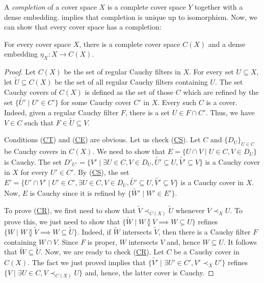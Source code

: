 \documentclass[reqno]{amsart}
\newcommand{\axref}[1]{(\hyperref[ax:#1]{#1})}
\theoremstyle{definition}
\theoremstyle{remark}
\numberwithin{figure}{section}
\newcommand{\overlap}[2]{#1 \between #2}
\newcommand{\rb}{\prec}
\begin{document}
A \emph{completion} of a cover space $X$ is a complete cover space $Y$ together with a dense embedding.
 implies that completion is unique up to isomorphism.
Now, we can show that every cover space has a completion:

\begin{thm}[completion]
For every cover space $X$, there is a complete cover space $C(X)$ and a dense embedding $\eta_X : X \to C(X)$.
\end{thm}
\begin{proof}
Let $C(X)$ be the set of regular Cauchy filters in $X$.
For every set $U \subseteq X$, let $\widetilde{U} \subseteq C(X)$ be the set of all regular Cauchy filters containing $U$.
The set Cauchy covers of $C(X)$ is defined as the set of those $C$ which are refined by the set $\{ \widetilde{U'} \mid U' \in C' \}$ for some Cauchy cover $C'$ in $X$.
Every such $C$ is a cover.
Indeed, given a regular Cauchy filter $F$, there is a set $U \in F \cap C'$.
Thus, we have $V \in C$ such that $F \in \widetilde{U} \subseteq V$.

Conditions \axref{CT} and \axref{CE} are obvious.
Let us check \axref{CS}.
Let $C$ and $\{ D_U \}_{U \in C}$ be Cauchy covers in $C(X)$.
We need to show that $E = \{ U \cap V \mid U \in C, V \in D_U \}$ is Cauchy.
The set $D'_{U'} = \{ V' \mid \exists U \in C, V \in D_U, \widetilde{U'} \subseteq U, \widetilde{V'} \subseteq V \}$ is a Cauchy cover in $X$ for every $U' \in C'$.
By \axref{CS}, the set $E' = \{ U' \cap V' \mid U' \in C', \exists U \in C, V \in D_U, \widetilde{U'} \subseteq U, \widetilde{V'} \subseteq V \}$ is a Cauchy cover in $X$.
Now, $E$ is Cauchy since it is refined by $\{ \widetilde{W'} \mid W' \in E' \}$.

To prove \axref{CR}, we first need to show that $\widetilde{V} \rb_{C(X)} \widetilde{U}$ whenever $V \rb_X U$.
To prove this, we just need to show that $\{ \widetilde{W} \mid \overlap{W}{V} \implies W \subseteq U \}$ refines $\{ W \mid \overlap{W}{\widetilde{V}} \implies W \subseteq \widetilde{U} \}$.
Indeed, if $\widetilde{W}$ intersects $\widetilde{V}$, then there is a Cauchy filter $F$ containing $W \cap V$.
Since $F$ is proper, $W$ intersects $V$ and, hence $W \subseteq U$.
It follows that $\widetilde{W} \subseteq \widetilde{U}$.
Now, we are ready to check \axref{CR}.
Let $C$ be a Cauchy cover in $C(X)$.
The fact we just proved implies that $\{ \widetilde{V'} \mid \exists U' \in C', V' \rb_X U' \}$ refines $\{ V \mid \exists U \in C, V \rb_{C(X)} U \}$ and, hence, the latter cover is Cauchy.


\end{proof}
\end{document}
